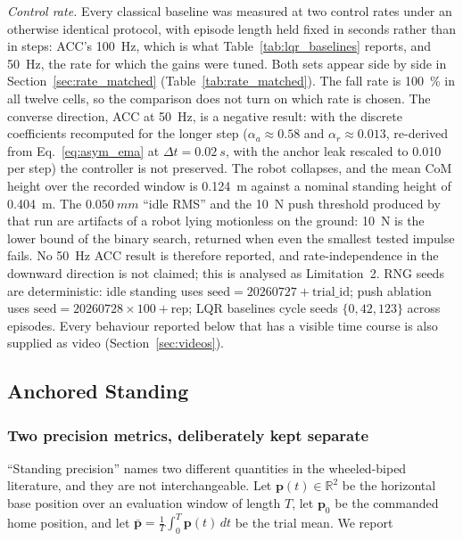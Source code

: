 \documentclass[a4paper,fleqn]{cas-dc}
\begin{document}
\emph{Control rate.} Every classical baseline was measured at two control rates under an otherwise identical protocol, with episode length held fixed in seconds rather than in steps: ACC's \SI{100}{Hz}, which is what Table~\ref{tab:lqr_baselines} reports, and \SI{50}{Hz}, the rate for which the gains were tuned. Both sets appear side by side in Section~\ref{sec:rate_matched} (Table~\ref{tab:rate_matched}). The fall rate is \SI{100}{\percent} in all twelve cells, so the comparison does not turn on which rate is chosen. The converse direction, ACC at \SI{50}{Hz}, is a negative result: with the discrete coefficients recomputed for the longer step ($\alpha_a{\approx}0.58$ and $\alpha_r{\approx}0.013$, re-derived from Eq.~\eqref{eq:asym_ema} at $\Delta t{=}\SI{0.02}{s}$, with the anchor leak rescaled to \num{0.010} per step) the controller is not preserved. The robot collapses, and the mean CoM height over the recorded window is \SI{0.124}{m} against a nominal standing height of \SI{0.404}{m}. The $\SI{0.050}{mm}$ ``idle RMS'' and the \SI{10}{N} push threshold produced by that run are artifacts of a robot lying motionless on the ground: \SI{10}{N} is the lower bound of the binary search, returned when even the smallest tested impulse fails. No \SI{50}{Hz} ACC result is therefore reported, and rate-independence in the downward direction is not claimed; this is analysed as Limitation~2.
RNG seeds are deterministic: idle standing uses $\text{seed} = 20260727 + \text{trial\_id}$; push ablation uses $\text{seed} = 20260728 \times 100 + \text{rep}$; LQR baselines cycle seeds $\{0, 42, 123\}$ across episodes.
Every behaviour reported below that has a visible time course is also supplied as video (Section~\ref{sec:videos}).

\subsection{Anchored Standing}
\label{sec:standing}

\subsubsection{Two precision metrics, deliberately kept separate}

``Standing precision'' names two different quantities in the wheeled-biped
literature, and they are not interchangeable. Let $\mathbf{p}(t)\in\mathbb{R}^2$ be
the horizontal base position over an evaluation window of length $T$, let
$\mathbf{p}_0$ be the commanded home position, and let
$\bar{\mathbf{p}}=\frac{1}{T}\int_0^T\mathbf{p}(t)\,dt$ be the trial mean. We report
\end{document}
